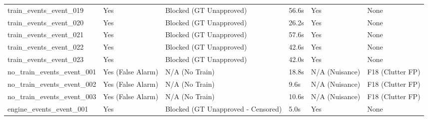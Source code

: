 \begin{table}[t]
\begin{tabular}{llllll}
train\_events\_event\_019 & Yes & Blocked (GT Unapproved) & 56.6s & Yes & None \\
train\_events\_event\_020 & Yes & Blocked (GT Unapproved) & 26.2s & Yes & None \\
train\_events\_event\_021 & Yes & Blocked (GT Unapproved) & 57.6s & Yes & None \\
train\_events\_event\_022 & Yes & Blocked (GT Unapproved) & 42.6s & Yes & None \\
train\_events\_event\_023 & Yes & Blocked (GT Unapproved) & 42.0s & Yes & None \\
no\_train\_events\_event\_001 & Yes (False Alarm) & N/A (No Train) & 18.8s & N/A (Nuisance) & F18 (Clutter FP) \\
no\_train\_events\_event\_002 & Yes (False Alarm) & N/A (No Train) & 9.6s & N/A (Nuisance) & F18 (Clutter FP) \\
no\_train\_events\_event\_003 & Yes (False Alarm) & N/A (No Train) & 10.6s & N/A (Nuisance) & F18 (Clutter FP) \\
engine\_events\_event\_001 & Yes & Blocked (GT Unapproved - Censored) & 5.0s & Yes & None \\
\hline
\end{tabular}
\end{table}

